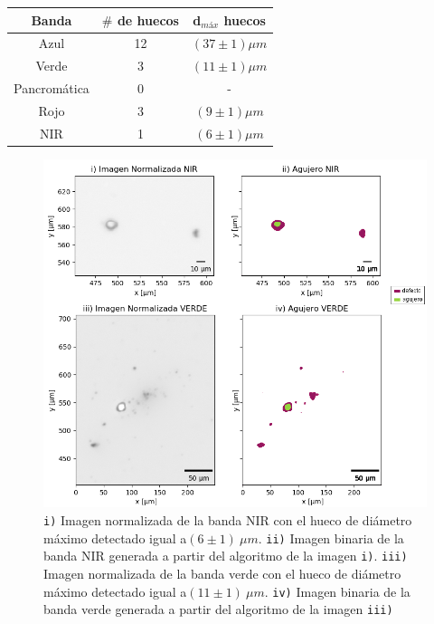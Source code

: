 \begin{table}[H]
\begin{center}
\begin{tabular}{ |c|c|c|}    \toprule
Banda & $\#$ de huecos & d$_{máx}$ huecos \\\midrule
\rowcolor{blue!15} Azul   & 12  & $(37 \pm 1) \mu m$  \\ 
\rowcolor{green!50} Verde  & 3 & $(11 \pm 1) \mu m$ \\ 
Pancromática & 0 & - \\
\rowcolor{red!50} Rojo  & 3 & $(9 \pm 1) \mu m$ \\
\rowcolor{maroon!20} NIR   & 1 & $(6 \pm 1) \mu m$ \\
\bottomrule
 \hline
\end{tabular}
\end{center}
 \label{tabaguj}
\end{table}


 \begin{figure}[H]
\centering
\includegraphics[scale=1.0]{Figs/cuantificaciondefectos/agujerross.png}
\caption{\texttt{i)} Imagen normalizada de la banda NIR con el hueco de diámetro máximo detectado igual a$(6 \pm 1)~ \mu m$. \texttt{ii)} Imagen binaria de la banda NIR generada a partir del algoritmo de la imagen \texttt{i)}. \texttt{iii)} Imagen normalizada de la banda verde con el hueco de diámetro máximo detectado igual a$(11 \pm 1)~ \mu m$. \texttt{iv)} Imagen binaria de la banda verde generada a partir del algoritmo de la imagen \texttt{iii)}}
\label{fig:aggjj}
\end{figure}

